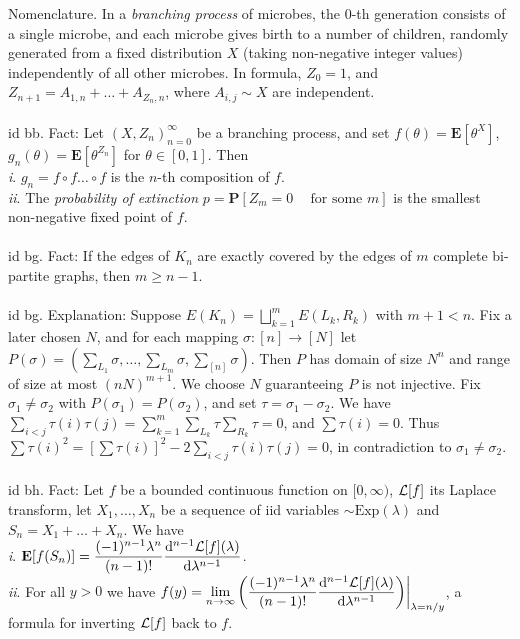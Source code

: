 \documentclass[oneside]{book}
\renewcommand{\P}{\mathbf{P}}
\newcommand{\E}{\mathbf{E}}
\newcommand{\fit}[1]{\left( #1\right)}
\renewcommand{\d}{\mathrm{d}}
\newcommand{\Exp}{\mathrm{Exp}}
\newcommand{\spc}{\phantom{-}}
\renewcommand{\i}{{\it i}. }
\newcommand{\ii}{{\it ii}. }
\begin{document}
Nomenclature. In a {\it branching process} of microbes, the $0$-th generation consists of a single microbe, and each microbe gives birth to a number of children, randomly generated from a fixed distribution $X$ (taking non-negative integer values) independently of all other microbes. In formula, $Z_0=1$, and $Z_{n+1}=A_{1,n}+\dots+A_{Z_n,n}$, where $A_{i,j}\sim X$ are independent.    \\\\


id bb. Fact: Let $(X,Z_n)_{n=0}^\infty$ be a branching process, and set $f(\theta)=\E[\theta^X]$, $g_n(\theta)=\E[\theta^{Z_n}]$ for $\theta\in[0,1]$. Then \\
\i $g_n=f\circ f\dots \circ f$ is the $n$-th composition of $f$.\\
\ii The {\it probability of extinction} $p=\P[Z_m=0 \spc \text{for some }m]$ is the smallest non-negative fixed point of $f$.   \\\\


id bg. Fact: If the edges of $K_n$ are exactly covered by the edges of $m$ complete bi-partite graphs, then $m\ge n-1$.    \\\\


id bg. Explanation: Suppose $E(K_n)=\bigsqcup_{k=1}^m E(L_k,R_k)$ with $m+1<n$. Fix a later chosen $N$, and for each mapping $\sigma:[n]\to [N]$ let $P(\sigma)=(\sum_{L_1}\sigma,\dots,\sum_{L_m}\sigma,\sum_{[n]}\sigma)$. Then $P$ has domain of size $N^n$ and range of size at most $(nN)^{m+1}$. We choose $N$ guaranteeing $P$ is not injective. Fix $\sigma_1\neq\sigma_2$ with $P(\sigma_1)=P(\sigma_2)$, and set $\tau=\sigma_1-\sigma_2$. We have $\sum_{i<j}\tau(i)\tau(j)=\sum_{k=1}^m \sum_{L_k}\tau\sum_{R_k}\tau=0$, and $\sum\tau(i)=0$. Thus $\sum\tau(i)^2=[\sum\tau(i)]^2-2\sum_{i<j}\tau(i)\tau(j)=0$, in contradiction to $\sigma_1\neq\sigma_2$. \\\\


id bh. Fact: Let $f$ be a bounded continuous function on $[0,\infty)$, $\mathcal{L}[f]$ its Laplace transform, let $X_1,\dots,X_n$ be a sequence of iid variables $\sim\Exp(\lambda)$ and $S_n=X_1+\dots+X_n$. We have \\
\i $\E[f(S_n)]=\dfrac{(-1)^{n-1}\lambda^n}{(n-1)!}\dfrac{\d^{n-1} \LL[f](\lambda)}{\d \lambda^{n-1}}$.\\
\ii For all $y>0$ we have $f(y)=\displaystyle\lim_{n\to\infty} \fit{\dfrac{(-1)^{n-1}\lambda^n}{(n-1)!}\dfrac{\d^{n-1} \LL[f](\lambda)}{\d \lambda^{n-1}}}\biggr\rvert_{\lambda=n/y}$, a formula for inverting $\mathcal{L}[f]$ back to $f$.    \\\\
\end{document}
